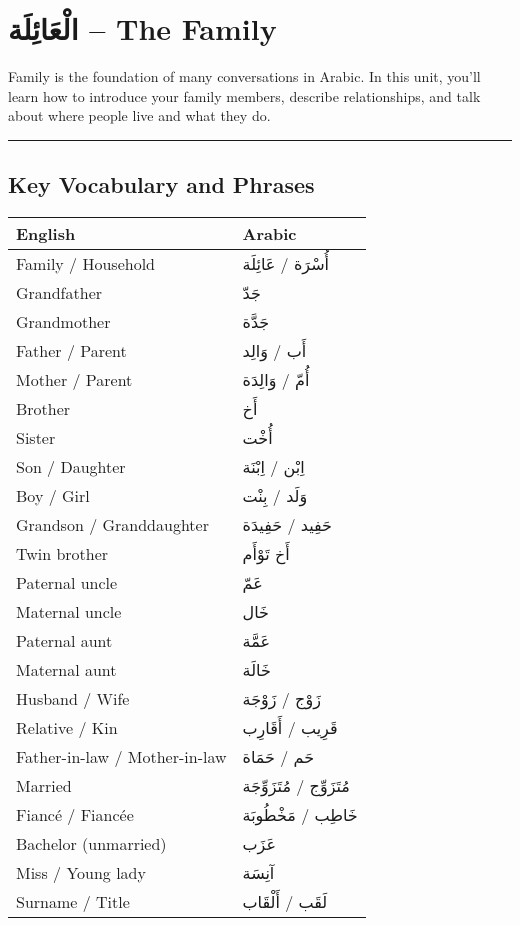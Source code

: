 \documentclass[
  a4paper,
  DIV=11,
  numbers=noendperiod]{scrartcl}
\begin{document}
\section{الْعَائِلَة -- The Family}\label{unit2-family}

Family is the foundation of many conversations in Arabic. In this unit,
you'll learn how to introduce your family members, describe
relationships, and talk about where people live and what they do.

\begin{center}\rule{0.5\linewidth}{0.5pt}\end{center}

\subsection{Key Vocabulary and
Phrases}\label{key-vocabulary-and-phrases-1}

\begin{longtable}[]{@{}ll@{}}
\toprule\noalign{}
English & Arabic \\
\midrule\noalign{}
\endhead
\bottomrule\noalign{}
\endlastfoot
Family / Household & أُسْرَة / عَائِلَة \\
Grandfather & جَدّ \\
Grandmother & جَدَّة \\
Father / Parent & أَب / وَالِد \\
Mother / Parent & أُمّ / وَالِدَة \\
Brother & أَخ \\
Sister & أُخْت \\
Son / Daughter & اِبْن / اِبْنَة \\
Boy / Girl & وَلَد / بِنْت \\
Grandson / Granddaughter & حَفِيد / حَفِيدَة \\
Twin brother & أَخ تَوْأَم \\
Paternal uncle & عَمّ \\
Maternal uncle & خَال \\
Paternal aunt & عَمَّة \\
Maternal aunt & خَالَة \\
Husband / Wife & زَوْج / زَوْجَة \\
Relative / Kin & قَرِيب / أَقَارِب \\
Father-in-law / Mother-in-law & حَم / حَمَاة \\
Married & مُتَزَوِّج / مُتَزَوِّجَة \\
Fiancé / Fiancée & خَاطِب / مَخْطُوبَة \\
Bachelor (unmarried) & عَزَب \\
Miss / Young lady & آنِسَة \\
Surname / Title & لَقَب / أَلْقَاب \\
\end{longtable}
\end{document}
